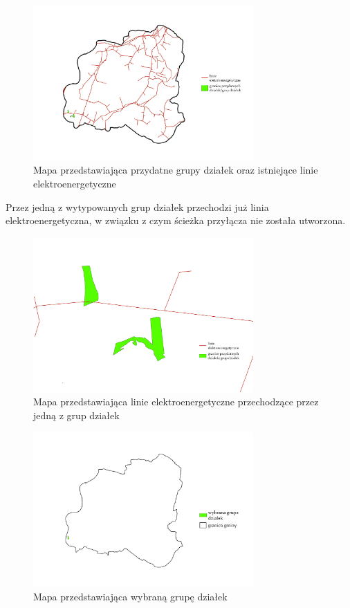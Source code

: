 \documentclass{article}
\begin{document}
\begin{figure}[H]
    \centering
    \includegraphics[width=0.75\textwidth]{img/plesna-dzialki-linie.jpg}
    \caption{Mapa przedstawiająca przydatne grupy działek oraz istniejące linie elektroenergetyczne}
\end{figure}

Przez jedną z wytypowanych grup działek przechodzi już linia elektroenergetyczna, w związku z czym ścieżka przyłącza nie została utworzona.

\begin{figure}[H]
    \centering
    \includegraphics[width=0.75\textwidth]{img/plesna-braksciezki.jpg}
    \caption{Mapa przedstawiająca linie elektroenergetyczne przechodzące przez jedną z grup działek}
\end{figure}

\begin{figure}[H]
    \centering
    \includegraphics[width=0.75\textwidth]{img/plesna-wybrana-grupa-dzialek.jpg}
    \caption{Mapa przedstawiająca wybraną grupę działek}
\end{figure}
\vspace{10pt}
\end{document}
